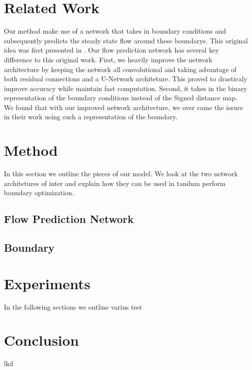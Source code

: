 \documentclass{article}
\begin{document}
\section{Related Work}

Our method make use of a network that takes in boundary conditions and subsequently predicts the steady state flow around these boundarys. This original idea was first presented in \cite{guo2016convolutional}. Our flow prediction network has several key difference to this original work. First, we heavily improve the network architecture by keeping the network all convolutional and taking advantage of both residual connections and a U-Network architeture. This proved to drasticaly improve accuracy while maintain fast computation. Second, it takes in the binary representation of the boundary conditions instead of the Signed distance map. We found that with our improved network architecture, we over came the issure in their work using such a representation of the boundary.

\section{Method}

In this section we outline the pieces of our model. We look at the two network architetures of inter and explain how they can be used in tandum perform boundary optimization.

\subsection{Flow Prediction Network}

\subsection{Boundary}

\section{Experiments}
In the following sections we outline varius test 


\section{Conclusion}
lkd



\end{document}
